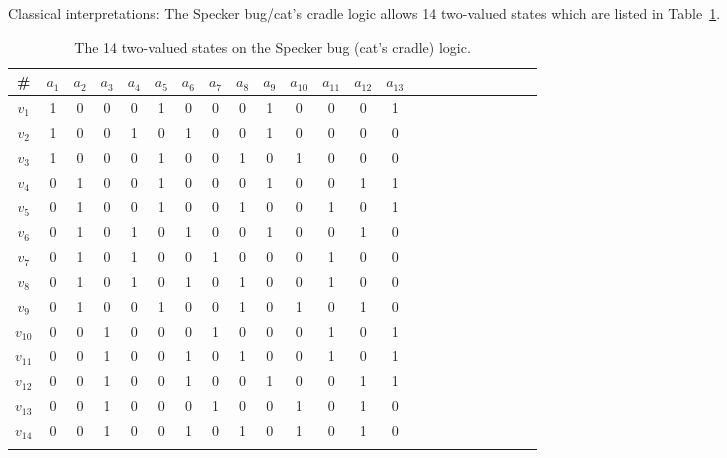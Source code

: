 Classical interpretations:
The Specker bug/cat's cradle logic allows 14 two-valued states which are listed in Table~\ref{2001-cesena-t2}.
 \begin{table}%
 \begin{center}
\caption{\label{2001-cesena-t2}  The 14 two-valued states on the Specker bug (cat's cradle) logic.}
 \begin{tabular}{ccccccccccccccccccccccc}
\# &$a_1$&$a_2$&$a_3$&$a_4$&$a_5$&$a_6$&$a_7$&$a_8$&$a_9$&$a_{10}$&$a_{11}$&$a_{12}$&$a_{13}$\\
\hline
$v_1 $&1&0&0&0&1&0&0&0&1&0&0&0&1         \\
$v_2 $&1&0&0&1&0&1&0&0&1&0&0&0&0          \\
$v_3 $&1&0&0&0&1&0&0&1&0&1&0&0&0         \\
$v_4 $&0&1&0&0&1&0&0&0&1&0&0&1&1         \\
$v_5 $&0&1&0&0&1&0&0&1&0&0&1&0&1         \\
$v_6 $&0&1&0&1&0&1&0&0&1&0&0&1&0          \\
$v_7 $&0&1&0&1&0&0&1&0&0&0&1&0&0          \\
$v_8 $&0&1&0&1&0&1&0&1&0&0&1&0&0          \\
$v_9 $&0&1&0&0&1&0&0&1&0&1&0&1&0         \\
$v_{10}$&0&0&1&0&0&0&1&0&0&0&1&0&1         \\
$v_{11}$&0&0&1&0&0&1&0&1&0&0&1&0&1         \\
$v_{12}$&0&0&1&0&0&1&0&0&1&0&0&1&1         \\
$v_{13}$&0&0&1&0&0&0&1&0&0&1&0&1&0         \\
$v_{14}$&0&0&1&0&0&1&0&1&0&1&0&1&0
\\ 
 \end{tabular}
 \end{center}
 \end{table}


